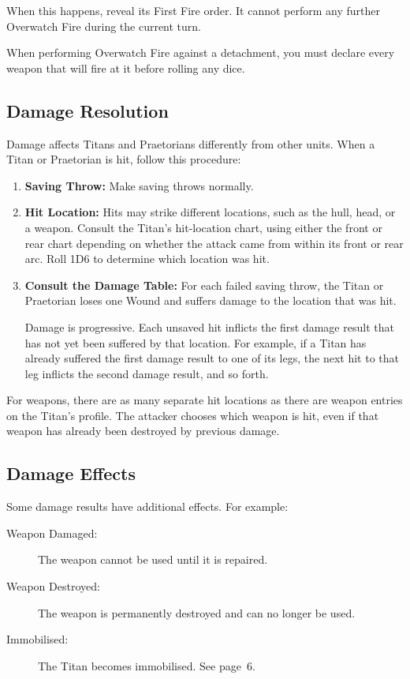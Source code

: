 When this happens, reveal its First Fire order. It cannot perform any further Overwatch Fire during the current turn.

When performing Overwatch Fire against a detachment, you must declare every weapon that will fire at it before rolling any dice.

\subsection{Damage Resolution}

Damage affects Titans and Praetorians differently from other units. When a Titan or Praetorian is hit, follow this procedure:

\begin{enumerate}
    \item \textbf{Saving Throw:} Make saving throws normally.

    \item \textbf{Hit Location:} Hits may strike different locations, such as the hull, head, or a weapon. Consult the Titan's hit-location chart, using either the front or rear chart depending on whether the attack came from within its front or rear arc. Roll 1D6 to determine which location was hit.

    \item \textbf{Consult the Damage Table:} For each failed saving throw, the Titan or Praetorian loses one Wound and suffers damage to the location that was hit.

    Damage is progressive. Each unsaved hit inflicts the first damage result that has not yet been suffered by that location. For example, if a Titan has already suffered the first damage result to one of its legs, the next hit to that leg inflicts the second damage result, and so forth.
\end{enumerate}

For weapons, there are as many separate hit locations as there are weapon entries on the Titan's profile. The attacker chooses which weapon is hit, even if that weapon has already been destroyed by previous damage.

\subsection{Damage Effects}

Some damage results have additional effects. For example:

\begin{description}
    \item[Weapon Damaged:] The weapon cannot be used until it is repaired.

    \item[Weapon Destroyed:] The weapon is permanently destroyed and can no longer be used.

    \item[Immobilised:] The Titan becomes immobilised. See page~6.
\end{description}

